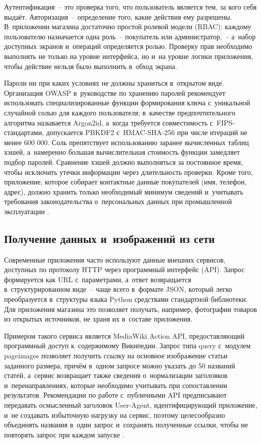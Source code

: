 \documentclass[14pt,a4paper]{extarticle}
\begin{document}
Аутентификация~– это проверка того, что пользователь является тем, за кого себя выдаёт. Авторизация~– определение того, какие действия ему разрешены. В~приложении магазина достаточно простой ролевой модели (RBAC): каждому пользователю назначается одна роль~– покупатель или администратор,~– а~набор доступных экранов и~операций определяется ролью. Проверку прав необходимо выполнять не только на уровне интерфейса, но и~на уровне логики приложения, чтобы действие нельзя было выполнить в~обход экрана.



Пароли ни при каких условиях не должны храниться в~открытом виде. Организация OWASP в~руководстве по хранению паролей рекомендует использовать специализированные функции формирования ключа с~уникальной случайной солью для каждого пользователя; в~качестве предпочтительного алгоритма называется Argon2id, а~когда требуется совместимость с~FIPS-стандартами, допускается PBKDF2 с~HMAC-SHA-256 при числе итераций не менее 600 000. Соль препятствует использованию заранее вычисленных таблиц хэшей, а~намеренно большая вычислительная стоимость функции замедляет подбор паролей. Сравнение хэшей должно выполняться за постоянное время, чтобы исключить утечки информации через длительность проверки. Кроме того, приложение, которое собирает контактные данные покупателей (имя, телефон, адрес), должно хранить только необходимый минимум сведений и~учитывать требования законодательства о~персональных данных при промышленной эксплуатации \cite{b6}.



\subsection{Получение данных и~изображений из сети}

Современные приложения часто используют данные внешних сервисов, доступных по протоколу HTTP через программный интерфейс (API). Запрос формируется как URL с~параметрами, а~ответ возвращается в~структурированном виде~– чаще всего в~формате JSON, который легко преобразуется в~структуры языка Python средствами стандартной библиотеки. Для приложения магазина это позволяет получать, например, фотографии товаров из открытых источников, не храня их в~составе приложения.



Примером такого сервиса является MediaWiki Action API, предоставляющий программный доступ к~содержимому Википедии. Запрос типа query с~модулем pageimages позволяет получить ссылку на основное изображение статьи заданного размера, причём в~одном запросе можно указать до 50 названий статей, а~сервис возвращает также сведения о~нормализации заголовков и~перенаправлениях, которые необходимо учитывать при сопоставлении результатов. Рекомендации по работе с~публичными API предписывают передавать осмысленный заголовок User-Agent, идентифицирующий приложение, и~не создавать избыточную нагрузку на сервис, поэтому целесообразно объединять названия в~один запрос и~сохранять полученные ссылки, чтобы не повторять запрос при каждом запуске \cite{b5}.
\end{document}
